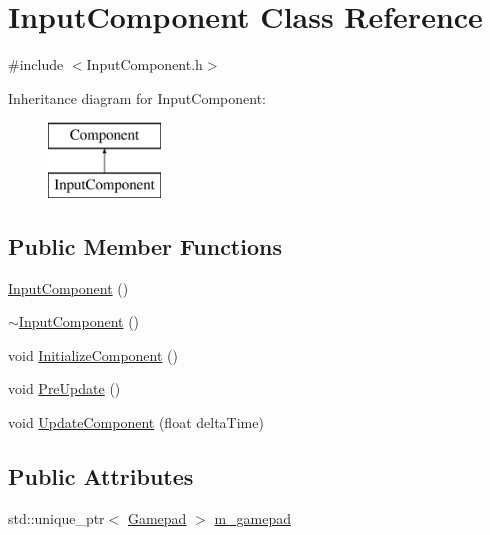 \hypertarget{class_input_component}{}\section{Input\+Component Class Reference}
\label{class_input_component}


{\ttfamily \#include $<$Input\+Component.\+h$>$}

Inheritance diagram for Input\+Component\+:\begin{figure}[H]
\begin{center}
\leavevmode
\includegraphics[height=2.000000cm]{class_input_component}
\end{center}
\end{figure}
\subsection*{Public Member Functions}
\begin{DoxyCompactItemize}
\item 
\mbox{\hyperlink{class_input_component_ae3af150f66c8e72ea4bef4b089c48d99}{Input\+Component}} ()
\item 
\mbox{\hyperlink{class_input_component_a50e6b9501302f0c8f055325ca652050e}{$\sim$\+Input\+Component}} ()
\item 
void \mbox{\hyperlink{class_input_component_ad4262870839371f79747db5b6faf25a7}{Initialize\+Component}} ()
\item 
void \mbox{\hyperlink{class_input_component_a99f431a305362899b8a6682b390c8899}{Pre\+Update}} ()
\item 
void \mbox{\hyperlink{class_input_component_a42d3b0dffbedfd8cf62702096780ed4d}{Update\+Component}} (float delta\+Time)
\end{DoxyCompactItemize}
\subsection*{Public Attributes}
\begin{DoxyCompactItemize}
\item 
std\+::unique\+\_\+ptr$<$ \mbox{\hyperlink{class_gamepad}{Gamepad}} $>$ \mbox{\hyperlink{class_input_component_a73abf6fc0132814d3cdca33aa5d3dfba}{m\+\_\+gamepad}}
\end{DoxyCompactItemize}
